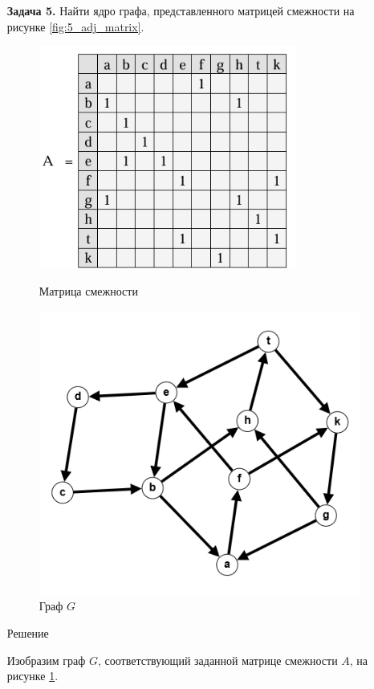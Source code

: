 \documentclass{article}
\begin{document}
\clearpage%
\begin{enumerate}
\item[\textbf{Задача 5.}] Найти ядро графа, представленного матрицей смежности на рисунке \ref{fig:5_adj_matrix}.
\begin{figure}[ht]
  \begin{minipage}[b]{0.5\textwidth}
    \centering
    \includegraphics[width=0.8\textwidth, center]{attachments/5/matrix.png}
    \caption{Матрица смежности}
    \label{fig:5_adj_matrix}
  \end{minipage}
  \hfill
  \begin{minipage}[b]{0.5\textwidth}
    \centering
    \includegraphics[width=.75\textwidth, center]{attachments/5/graph.png}
    \caption{Граф $G$}
    \label{fig:5_graph}
  \end{minipage}
\end{figure}
\begin{center}
Решение 
\end{center}
Изобразим граф $G$, соответствующий заданной матрице смежности $A$, на рисунке \ref{fig:5_graph}. 


\end{enumerate}
\end{document}
